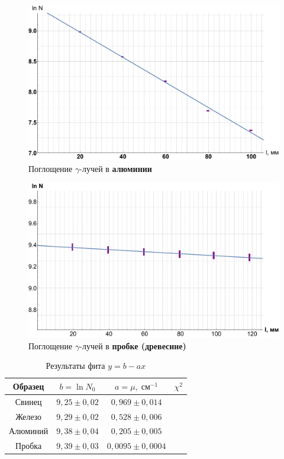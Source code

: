 \documentclass[12pt]{kiarticle}
\newcommand{\ga}{\ensuremath{\gamma}}
\begin{document}
	\begin{figure}[h!]
	\label{graf_al}
	\includegraphics[scale=0.47]{al.pdf}
	\caption{Поглощение \ga-лучей в \textbf{алюминии}}
\end{figure}

	\begin{figure}[h!]
	\label{graf_d}
	\includegraphics[scale=0.47]{d.pdf}
	\caption{Поглощение \ga-лучей в \textbf{пробке (древесине)}}
\end{figure}

 \begin{table}[h!]
	\caption{Результаты фита $ y = b - ax $}
	\begin{center}
		\begin{tabular}{|c|c|c|c|}
			\hline
			Образец & $ b = \ln N_0 $ &  $ a = \mu, \; см^{-1} $ & $ \chi^2 $  \\
			\hline
			Свинец &	$ 9,25	\pm	0,02 $ &	$ 0,969	\pm	0,014 $ & \\
			Железо &	$ 9,29	\pm	0,02 $ &	$ 0,528	\pm	0,006 $ & \\
			Алюминий	& $ 9,38	\pm	0,04 $ &	$ 0,205	\pm	0,005 $ & \\
			Пробка	&	$ 9,39	\pm	0,03 $ &	$ 0,0095	\pm	0,0004 $ & \\
			\hline
		\end{tabular}
	\end{center}
	\label{table_5}
\end{table}


	
	
\end{document}
